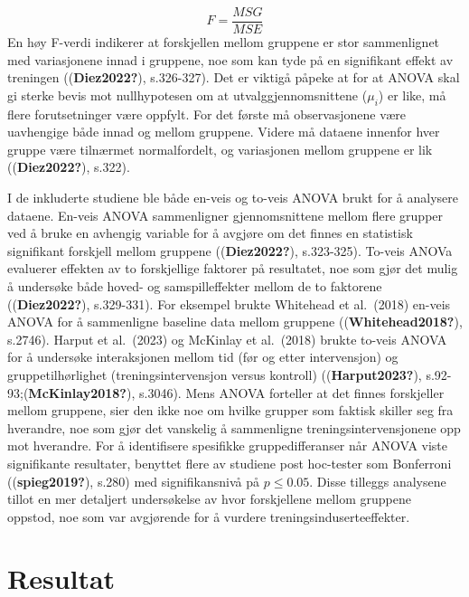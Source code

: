 \documentclass[
  letterpaper,
  DIV=11,
  numbers=noendperiod]{scrreprt}
\begin{document}
\[
F = \frac{MSG}{MSE}
\] En høy F-verdi indikerer at forskjellen mellom gruppene er stor
sammenlignet med variasjonene innad i gruppene, noe som kan tyde på en
signifikant effekt av treningen ((\textbf{Diez2022?}), s.326-327). Det
er viktigå påpeke at for at ANOVA skal gi sterke bevis mot nullhypotesen
om at utvalggjennomsnittene (\(\mu_i\)) er like, må flere forutsetninger
være oppfylt. For det første må observasjonene være uavhengige både
innad og mellom gruppene. Videre må dataene innenfor hver gruppe være
tilnærmet normalfordelt, og variasjonen mellom gruppene er lik
((\textbf{Diez2022?}), s.322).

I de inkluderte studiene ble både en-veis og to-veis ANOVA brukt for å
analysere dataene. En-veis ANOVA sammenligner gjennomsnittene mellom
flere grupper ved å bruke en avhengig variable for å avgjøre om det
finnes en statistisk signifikant forskjell mellom gruppene
((\textbf{Diez2022?}), s.323-325). To-veis ANOVa evaluerer effekten av
to forskjellige faktorer på resultatet, noe som gjør det mulig å
undersøke både hoved- og samspilleffekter mellom de to faktorene
((\textbf{Diez2022?}), s.329-331). For eksempel brukte Whitehead et
al.~(2018) en-veis ANOVA for å sammenligne baseline data mellom gruppene
((\textbf{Whitehead2018?}), s.2746). Harput et al.~(2023) og McKinlay et
al.~(2018) brukte to-veis ANOVA for å undersøke interaksjonen mellom tid
(før og etter intervensjon) og gruppetilhørlighet (treningsintervensjon
versus kontroll) ((\textbf{Harput2023?}),
s.92-93;(\textbf{McKinlay2018?}), s.3046). Mens ANOVA forteller at det
finnes forskjeller mellom gruppene, sier den ikke noe om hvilke grupper
som faktisk skiller seg fra hverandre, noe som gjør det vanskelig å
sammenligne treningsintervensjonene opp mot hverandre. For å
identifisere spesifikke gruppedifferanser når ANOVA viste signifikante
resultater, benyttet flere av studiene post hoc-tester som Bonferroni
((\textbf{spieg2019?}), s.280) med signifikansnivå på \(p \leq 0.05\).
Disse tilleggs analysene tillot en mer detaljert undersøkelse av hvor
forskjellene mellom gruppene oppstod, noe som var avgjørende for å
vurdere treningsinduserteeffekter.

\section{Resultat}\label{resultat-3}
\end{document}
